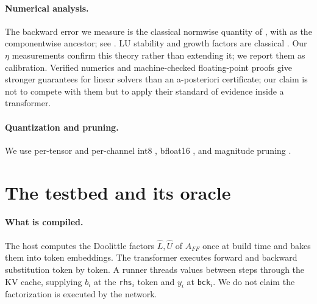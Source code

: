 \documentclass{article}
\theoremstyle{definition}
\newcommand{\bwe}{\ensuremath{\eta}}
\begin{document}
\paragraph{Numerical analysis.} The backward error we measure is the classical
normwise quantity of \citet{rigal1967compatibility}, with
\citet{oettli1964compatibility} as the componentwise ancestor; see
\citet[Thm~7.1]{higham2002accuracy}. LU stability and growth factors are
classical \citep{wilkinson1961error,wilkinson1963rounding,higham2002accuracy}.
Our $\bwe$ measurements confirm this theory rather than extending it; we report
them as calibration. Verified numerics
\citep{rump1983solving,rump1999intlab,rump2010verification,ogita2005accurate}
and machine-checked floating-point proofs
\citep{boldo2011flocq,daumas2010certification,roux2016formal,kellison2023laproof,kwan2024formalizing}
give stronger guarantees for linear solvers than an a-posteriori certificate;
our claim is not to compete with them but to apply their standard of evidence
inside a transformer.

\paragraph{Quantization and pruning.} We use per-tensor and per-channel int8
\citep{jacob2018quantization,krishnamoorthi2018quantizing,nagel2021whitepaper,dettmers2022llmint8},
bfloat16 \citep{kalamkar2019bfloat16,burgess2019bfloat16}, and magnitude pruning
\citep{han2015learning,han2016deepcompression,frankle2019lottery}.

\section{The testbed and its oracle}\label{sec:testbed}

\paragraph{What is compiled.} The host computes the Doolittle factors
$\hat L,\hat U$ of $A_{FF}$ once at build time and bakes them into token
embeddings. The transformer executes forward and backward substitution token by
token. A runner threads values between steps through the KV cache, supplying
$b_i$ at the \texttt{rhs}$_i$ token and $y_i$ at \texttt{bck}$_i$. We do not
claim the factorization is executed by the network.
\end{document}
